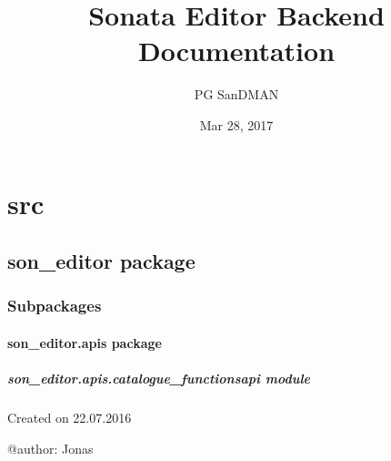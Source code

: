 \documentclass[letterpaper,10pt,english]{sphinxmanual}
\title{Sonata Editor Backend Documentation}
\date{Mar 28, 2017}
\author{PG SanDMAN}
\begin{document}
\maketitle
\sphinxtableofcontents
{}\label{index::doc}



\chapter{src}
\label{_source/modules:src}\label{_source/modules:welcome-to-sonata-editor-backend-s-documentation}\label{_source/modules::doc}

\section{son\_editor package}
\label{_source/son_editor:son-editor-package}\label{_source/son_editor::doc}

\subsection{Subpackages}
\label{_source/son_editor:subpackages}

\subsubsection{son\_editor.apis package}
\label{_source/son_editor.apis:son-editor-apis-package}\label{_source/son_editor.apis::doc}

\paragraph{son\_editor.apis.catalogue\_functionsapi module}
\label{_source/son_editor.apis:module-son_editor.apis.catalogue_functionsapi}\label{_source/son_editor.apis:son-editor-apis-catalogue-functionsapi-module}
Created on 22.07.2016

@author: Jonas
\end{document}
